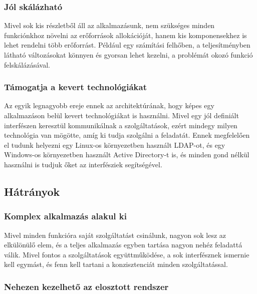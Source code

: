 \documentclass[11pt,magyar,a4paper,twoside,]{report}
\begin{document}
\subsubsection{Jól skálázható}\label{juxf3l-skuxe1luxe1zhatuxf3}

Mivel sok kis részletből áll az alkalmazásunk, nem szükséges minden
funkciónkhoz növelni az erőforrások allokációját, hanem kis
komponensekhez is lehet rendelni több erőforrást. Például egy számítási
felhőben, a teljesítményben látható változásokat könnyen és gyorsan
lehet kezelni, a problémát okozó funkció felskálázásával.

\subsubsection{Támogatja a kevert
technológiákat}\label{tuxe1mogatja-a-kevert-technoluxf3giuxe1kat}

Az egyik legnagyobb ereje ennek az architektúrának, hogy képes egy
alkalmazáson belül kevert technológiákat is használni. Mivel egy jól
definiált interfészen keresztül kommunikálnak a szolgáltatások, ezért
mindegy milyen technológia van mögötte, amíg ki tudja szolgálni a
feladatát. Ennek megfelelően el tudunk helyezni egy Linux-os
környezetben használt LDAP-ot, és egy Windows-os környezetben használt
Active Directory-t is, és minden gond nélkül használni is tudjuk őket az
interfésziek segítségével.

\subsection{Hátrányok}\label{huxe1truxe1nyok}

\subsubsection{Komplex alkalmazás alakul
ki}\label{komplex-alkalmazuxe1s-alakul-ki}

Mivel minden funkcióra saját szolgáltatást csinálunk, nagyon sok lesz az
elkülönülő elem, és a teljes alkalmazás egyben tartása nagyon nehéz
feladattá válik. Mivel fontos a szolgáltatások együttműködése, a sok
interfésznek ismernie kell egymást, és fenn kell tartani a
konzisztenciát minden szolgáltatással.

\subsubsection{Nehezen kezelhető az elosztott
rendszer}\label{nehezen-kezelhetux151-az-elosztott-rendszer}
\end{document}
